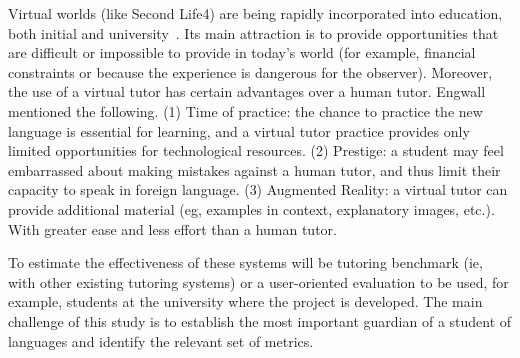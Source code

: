 
Virtual worlds (like Second Life4) are being rapidly incorporated into
education, both initial and university~\cite{Doswell05,molk:lear09}. Its main
attraction is to provide opportunities that are
difficult or impossible to provide in today's world (for example, financial
constraints or because the experience is dangerous for the observer). Moreover,
the use of a virtual tutor has certain advantages over a human tutor.
Engwall~ mentioned the following. (1) Time of
practice: the chance to practice the
new language is essential for learning, and a virtual tutor practice provides
only limited opportunities for technological resources. (2) Prestige: a student
may feel embarrassed about making mistakes against a human tutor, and thus limit
their capacity to speak in foreign language. (3) Augmented Reality: a virtual
tutor can provide additional material (eg, examples in context, explanatory
images, etc.). With greater ease and less effort than a human tutor.


To estimate the effectiveness of these systems will be tutoring benchmark (ie,
with other existing tutoring systems) or a user-oriented evaluation to be used,
for example, students at the university where the project is developed. The main
challenge of this study is to establish the most important guardian of a student
of languages and identify the relevant set of metrics. 








